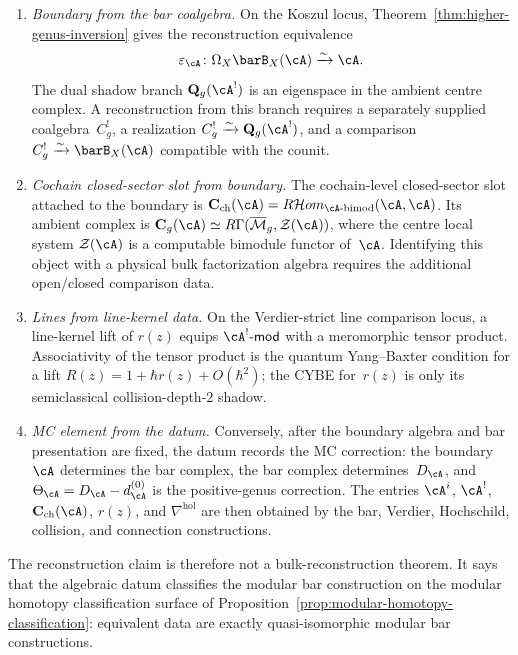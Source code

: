 \begin{enumerate}[label=\textup{(\roman*)}]
\item \emph{Boundary from the bar coalgebra.}
 On the Koszul locus, Theorem~\ref{thm:higher-genus-inversion} gives
 the reconstruction equivalence
 \[
 \varepsilon_\cA\colon\Omega_X\barB_X(\cA)
 \xrightarrow{\sim}\cA.
 \]
 The dual shadow branch $\mathbf Q_g(\cA^!)$ is an eigenspace in the
 ambient centre complex.  A reconstruction from this branch requires
 a separately supplied coalgebra~$C_g^!$, a realization
 $C_g^!\xrightarrow{\sim}\mathbf Q_g(\cA^!)$, and a comparison
 $C_g^!\xrightarrow{\sim}\barB_X(\cA)$ compatible with the counit.

\item \emph{Cochain closed-sector slot from boundary.}
 The cochain-level closed-sector slot attached to the boundary is
 $\mathbf{C}_{\mathrm{ch}}(\cA)
 =R\mathcal{H}om_{\cA\text{-bimod}}(\cA,\cA)$.
 Its ambient complex is
 $\mathbf{C}_g(\cA) \simeq R\Gamma(\overline{\mathcal{M}}_g,
 \mathcal{Z}(\cA))$, where the centre local system
 $\mathcal{Z}(\cA)$ is a computable bimodule functor of~$\cA$.
 Identifying this object with a physical bulk factorization algebra
 requires the additional open/closed comparison data.

\item \emph{Lines from line-kernel data.}
 On the Verdier-strict line comparison locus, a line-kernel lift of
 $r(z)$ equips $\cA^!\text{-}\mathsf{mod}$ with a meromorphic tensor
 product. Associativity of the tensor product is the quantum
 Yang--Baxter condition for a lift
 $R(z)=1+\hbar r(z)+O(\hbar^2)$; the CYBE for~$r(z)$ is only its
 semiclassical collision-depth-$2$ shadow.

\item \emph{MC element from the datum.}
 Conversely, after the boundary algebra and bar presentation are fixed,
 the datum records the MC correction:
 the boundary~$\cA$ determines the bar complex, the bar complex
 determines~$D_\cA$, and $\Theta_\cA = D_\cA - d_\cA^{(0)}$ is
 the positive-genus correction. The entries $\cA^i$, $\cA^!$,
 $\mathbf{C}_{\mathrm{ch}}(\cA)$, $r(z)$, and
 $\nabla^{\mathrm{hol}}$ are then obtained by the bar, Verdier,
 Hochschild, collision, and connection constructions.
\end{enumerate}

The reconstruction claim is therefore not a bulk-reconstruction
theorem. It says that the algebraic datum classifies the modular bar
construction on the modular homotopy classification surface of
Proposition~\ref{prop:modular-homotopy-classification}: equivalent
data are exactly quasi-isomorphic modular bar constructions.

